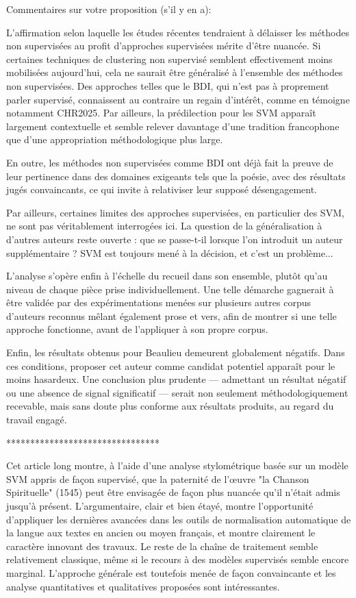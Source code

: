 Commentaires sur votre proposition (s’il y en a):


L’affirmation selon laquelle les études récentes tendraient à délaisser les méthodes non supervisées au profit d’approches supervisées mérite d’être nuancée. Si certaines techniques de clustering non supervisé semblent effectivement moins mobilisées aujourd’hui, cela ne saurait être généralisé à l’ensemble des méthodes non supervisées. Des approches telles que le BDI, qui n’est pas à proprement parler supervisé, connaissent au contraire un regain d’intérêt, comme en témoigne notamment CHR2025. Par ailleurs, la prédilection pour les SVM apparaît largement contextuelle et semble relever davantage d’une tradition francophone que d’une appropriation méthodologique plus large.


En outre, les méthodes non supervisées comme BDI ont déjà fait la preuve de leur pertinence dans des domaines exigeants tels que la poésie, avec des résultats jugés convaincants, ce qui invite à relativiser leur supposé désengagement.


Par ailleurs, certaines limites des approches supervisées, en particulier des SVM, ne sont pas véritablement interrogées ici. La question de la généralisation à d’autres auteurs reste ouverte : que se passe-t-il lorsque l’on introduit un auteur supplémentaire ? SVM est toujours mené à la décision, et c'est un problème...


L’analyse s'opère enfin à l’échelle du recueil dans son ensemble, plutôt qu’au niveau de chaque pièce prise individuellement. Une telle démarche gagnerait à être validée par des expérimentations menées sur plusieurs autres corpus d'auteurs reconnus mêlant également prose et vers, afin de montrer si une telle approche fonctionne, avant de l'appliquer à son propre corpus.


Enfin, les résultats obtenus pour Beaulieu demeurent globalement négatifs. Dans ces conditions, proposer cet auteur comme candidat potentiel apparaît pour le moins hasardeux. Une conclusion plus prudente — admettant un résultat négatif ou une absence de signal significatif — serait non seulement méthodologiquement recevable, mais sans doute plus conforme aux résultats produits, au regard du travail engagé.


********************************


Cet article long montre, à l'aide d'une analyse stylométrique basée sur un modèle SVM appris de façon supervisé, que la paternité de l'œuvre "la Chanson Spirituelle" (1545) peut être envisagée de façon plus nuancée qu'il n'était admis jusqu'à présent.
L'argumentaire, clair et bien étayé, montre l'opportunité d'appliquer les dernières avancées dans les outils de normalisation automatique de la langue aux textes en ancien ou moyen français, et montre clairement le caractère innovant des travaux.
Le reste de la chaîne de traitement semble relativement classique, même si le recours à des modèles supervisés semble encore marginal.
L'approche générale est toutefois menée de façon convaincante et les analyse quantitatives et qualitatives proposées sont intéressantes.

